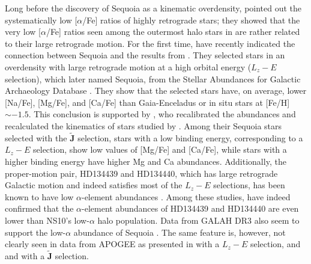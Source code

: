 \documentclass{aa}
\begin{document}
Long before the discovery of Sequoia as a kinematic overdensity, \citet{Venn2004a} pointed out the systematically low [$\alpha$/{Fe}] ratios of highly retrograde stars; they showed that the very low [$\alpha$/{Fe}] ratios seen among the outermost halo stars in \citet{Stephens2002} are rather related to their large retrograde motion.
For the first time, \citet{Matsuno2019a} have recently indicated the connection between Sequoia and the results from \citet{Venn2004a}.
They selected stars in an overdensity with large retrograde motion at a high orbital energy ($L_z-E$ selection), which later named Sequoia, from the Stellar Abundances for Galactic Archaeology Database \citep{Suda2008,Suda2011,Yamada2013,Suda2017a}.
They show that the selected stars have, on average, lower [{Na}/{Fe}], [{Mg}/{Fe}], and [{Ca}/{Fe}] than Gaia-Enceladus or in situ stars at [{Fe}/{H}]$\sim-1.5$.
This conclusion is supported by \citet{Monty2020a}, who recalibrated the abundances and recalculated the kinematics of stars studied by \citet{Stephens2002}.
Among their Sequoia stars selected with the $\tilde{\textbf{J}}$ selection, stars with a low binding energy, corresponding to a $L_z-E$ selection, show low values of [{Mg}/{Fe}] and [{Ca}/{Fe}], while stars with a higher binding energy have higher Mg and Ca abundances.
Additionally, the proper-motion pair, HD134439 and HD134440, which has large retrograde Galactic motion \citep{King1997a,Lim2021a} and indeed satisfies most of the $L_z-E$ selections, has been known to have low $\alpha$-element abundances \citep{King1997a,Chen2006a,Chen2014a,Reggiani2018a,Lim2021a}.
Among these studies, \citet{Reggiani2018a} have indeed confirmed that the $\alpha$-element abundances of HD134439 and HD134440 are even lower than NS10's low-$\alpha$ halo population.
Data from GALAH DR3 also seem to support the low-$\alpha$ abundance of Sequoia \citep[see $\alpha$-element abundance presented in][who used a $L_z-E$ selection]{Aguado2021a}.
The same feature is, however, not clearly seen in data from APOGEE as presented in \cite{Koppelman2019a} with a $L_z-E$ selection, and \citet{Myeong2019a} and \citet{Feuillet2021a} with a $\tilde{\textbf{J}}$ selection.
\end{document}
